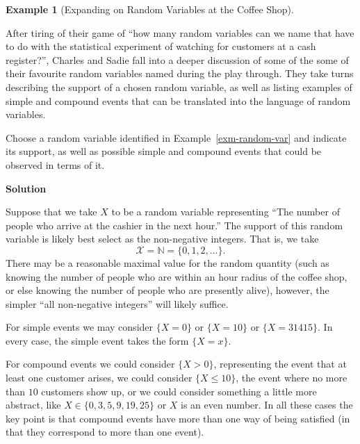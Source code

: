 \documentclass[
  letterpaper,
  DIV=11,
  numbers=noendperiod]{scrreprt}
\theoremstyle{definition}
\theoremstyle{definition}
\newtheorem{example}{Example}[chapter]
\theoremstyle{definition}
\theoremstyle{remark}
\begin{document}
\begin{example}[Expanding on Random Variables at the Coffee
Shop]\protect\hypertarget{exm-rv-recap}{}\label{exm-rv-recap}

After tiring of their game of ``how many random variables can we name
that have to do with the statistical experiment of watching for
customers at a cash register?'', Charles and Sadie fall into a deeper
discussion of some of the some of their favourite random variables named
during the play through. They take turns describing the support of a
chosen random variable, as well as listing examples of simple and
compound events that can be translated into the language of random
variables.

Choose a random variable identified in Example~\ref{exm-random-var} and
indicate its support, as well as possible simple and compound events
that could be observed in terms of it.

\begin{tcolorbox}[enhanced jigsaw, colback=white, colframe=quarto-callout-color-frame, arc=.35mm, leftrule=.75mm, rightrule=.15mm, opacityback=0, breakable, bottomrule=.15mm, left=2mm, toprule=.15mm]

\vspace{-3mm}\textbf{Solution}\vspace{3mm}

Suppose that we take \(X\) to be a random variable representing ``The
number of people who arrive at the cashier in the next hour.'' The
support of this random variable is likely best select as the
non-negative integers. That is, we take
\[\mathcal{X} = \mathbb{N} = \{0,1,2,\dots\}.\] There may be a
reasonable maximal value for the random quantity (such as knowing the
number of people who are within an hour radius of the coffee shop, or
else knowing the number of people who are presently alive), however, the
simpler ``all non-negative integers'' will likely suffice.

For simple events we may consider \(\{X = 0\}\) or \(\{X = 10\}\) or
\(\{X = 31415\}\). In every case, the simple event takes the form
\(\{X = x\}\).

For compound events we could consider \(\{X > 0\}\), representing the
event that at least one customer arises, we could consider
\(\{X \leq 10\}\), the event where no more than \(10\) customers show
up, or we could consider something a little more abstract, like
\(X \in \{0, 3, 5, 9, 19, 25\}\) or \(X\) is an even number. In all
these cases the key point is that compound events have more than one way
of being satisfied (in that they correspond to more than one event).

\end{tcolorbox}

\end{example}
\end{document}
